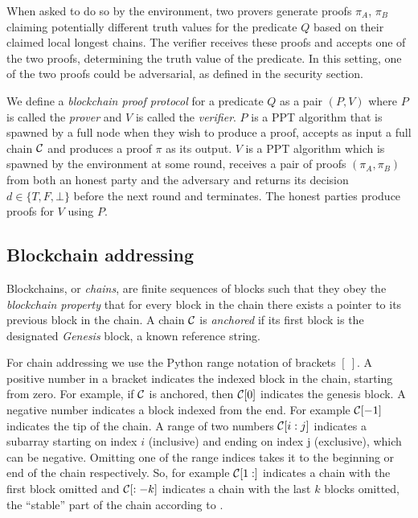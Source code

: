 When asked to do so by the environment, two provers generate proofs $\pi_A$,
$\pi_B$ claiming potentially different truth values for the predicate $Q$ based
on their claimed local longest chains. The verifier receives these proofs and
accepts one of the two proofs, determining the truth value of the predicate. In
this setting, one of the two proofs could be adversarial, as defined in the
security section.

We define a \textit{blockchain proof protocol} for a predicate $Q$ as a pair
$(P, V)$ where $P$ is called the \textit{prover} and $V$ is called the
\textit{verifier}. $P$ is a PPT algorithm that is spawned by a full node
when they wish to produce a proof, accepts as input a full chain $\mathcal{C}$ and
produces a proof $\pi$ as its output. $V$ is a PPT algorithm which is spawned
by the environment at some round, receives a pair of proofs $(\pi_A, \pi_B)$
from both an honest party and the adversary and returns its decision $d \in \{T,
F, \bot\}$ before the next round and terminates. The honest parties produce
proofs for $V$ using $P$.

\subsection{Blockchain addressing}

Blockchains, or \textit{chains}, are finite sequences of blocks such that they
obey the \textit{blockchain property} that for every block in the chain there
exists a pointer to its previous block in the chain. A chain $\mathcal{C}$ is
\textit{anchored} if its first block is the designated \textit{Genesis} block, a
known reference string.

For chain addressing we use the Python range notation of brackets $[~]$. A
positive number in a bracket indicates the indexed block in the chain, starting
from zero. For example, if $\mathcal{C}$ is anchored, then $\mathcal{C}[0]$ indicates the
genesis block. A negative number indicates a block indexed from the end.  For
example $\mathcal{C}[-1]$ indicates the tip of the chain. A range of two numbers
$\mathcal{C}[i:j]$ indicates a subarray starting on index $i$ (inclusive) and ending
on index j (exclusive), which can be negative. Omitting one of the range indices
takes it to the beginning or end of the chain respectively. So, for example
$\mathcal{C}[1:]$ indicates a chain with the first block omitted and $\mathcal{C}[:-k]$
indicates a chain with the last $k$ blocks omitted, the ``stable'' part of the
chain according to \cite{backbone}.

